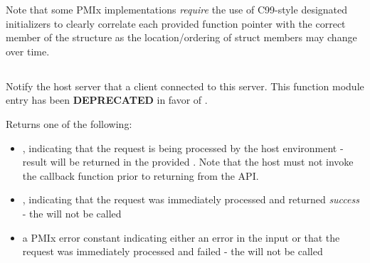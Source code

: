 \advicermstart
Note that some \ac{PMIx} implementations \emph{require} the use of C99-style
designated initializers to clearly correlate each provided function pointer with the correct member of the  structure as the location/ordering of struct members may change over time.
\advicermend

\subsection{}

\summary

Notify the host server that a client connected to this server. This function module entry has been \textbf{DEPRECATED} in favor of .

\format


\begin{arglist}
\end{arglist}

Returns one of the following:

\begin{itemize}
    \item {}, indicating that the request is being processed by the host environment - result will be returned in the provided . Note that the host must not invoke the callback function prior to returning from the \ac{API}.
    \item {}, indicating that the request was immediately processed and returned \textit{success} - the  will not be called
    \item a PMIx error constant indicating either an error in the input or that the request was immediately processed and failed - the  will not be called
\end{itemize}

